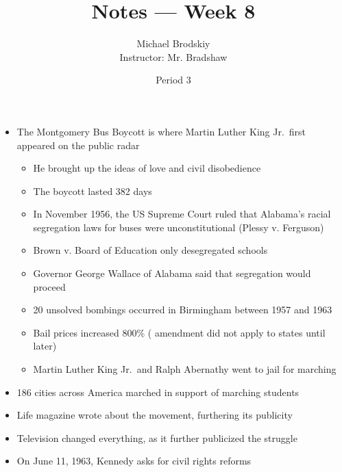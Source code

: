 \documentclass[12pt]{article}
\title{Notes — Week 8}
\date{Period 3}
\author{Michael Brodskiy\\ \small Instructor: Mr. Bradshaw}
\begin{document}
\maketitle

\begin{itemize}

  \item The Montgomery Bus Boycott is where Martin Luther King Jr.\ first appeared on the public radar

    \begin{itemize}

      \item He brought up the ideas of love and civil disobedience

      \item The boycott lasted 382 days

      \item In November 1956, the US Supreme Court ruled that Alabama's racial segregation laws for buses were unconstitutional (Plessy v. Ferguson)

      \item Brown v. Board of Education only desegregated schools

      \item Governor George Wallace of Alabama said that segregation would proceed

      \item 20 unsolved bombings occurred in Birmingham between 1957 and 1963

      \item Bail prices increased 800\% ( amendment did not apply to states until later)

      \item Martin Luther King Jr.\ and Ralph Abernathy went to jail for marching

    \end{itemize}

  \item 186 cities across America marched in support of marching students

  \item Life magazine wrote about the movement, furthering its publicity

  \item Television changed everything, as it further publicized the struggle

  \item On June 11, 1963, Kennedy asks for civil rights reforms


\end{itemize}
\end{document}
